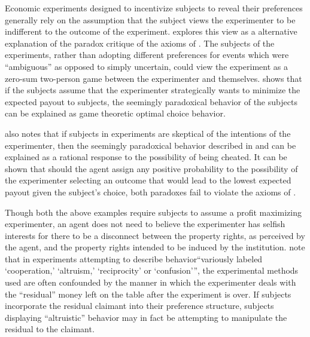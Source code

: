 \documentclass[../main.tex]{subfiles}
\begin{document}
Economic experiments designed to incentivize subjects to reveal their preferences generally rely on the assumption that the subject views the experimenter to be indifferent to the outcome of the experiment.
\textcite{Schneeweiss1973} explores this view as a alternative explanation of the \textcite{Ellsberg1961} paradox critique of the axioms of \textcite{Savage1954}.
The subjects of the \textcite{Ellsberg1961} experiments, rather than adopting different preferences for events which were \enquote{ambiguous} as opposed to simply uncertain, could view the experiment as a zero-sum two-person game between the experimenter and themselves.
\textcite{Schneeweiss1973} shows that if the subjects assume that the experimenter strategically wants to minimize the expected payout to subjects, the seemingly paradoxical behavior of the subjects can be explained as game theoretic optimal choice behavior.

\textcite{Kadane1992} also notes that if subjects in experiments are skeptical of the intentions of the experimenter, then the seemingly paradoxical behavior described in \textcite{Ellsberg1961} and \textcite{Allais1953} can be explained as a rational response to the possibility of being cheated.
It can be shown that should the agent assign any positive probability to the possibility of the experimenter selecting an outcome that would lead to the lowest expected payout given the subject's choice, both paradoxes fail to violate the axioms of \textcite{Savage1954}.

Though both the above examples require subjects to assume a profit maximizing experimenter, an agent does not need to believe the experimenter has selfish interests for there to be a disconnect between the property rights, as perceived by the agent, and the property rights intended to be induced by the institution.
\textcite[178]{Harrison2006} note that in experiments attempting to describe behavior\enquote{variously labeled \enquote{cooperation,} \enquote{altruism,} \enquote{reciprocity} or \enquote{confusion}}, the experimental methods used are often confounded by the manner in which the experimenter deals with the \enquote{residual} money left on the table after the experiment is over.
If subjects incorporate the residual claimant into their preference structure, subjects displaying \enquote{altruistic} behavior may in fact be attempting to manipulate the residual to the claimant.
\end{document}
